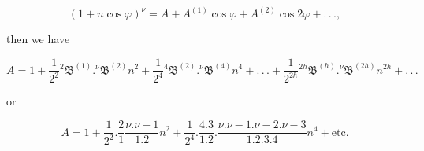 \[
(1+n\cos\varphi)^{\nu} = A + A^{(1)}\cos\varphi + A^{(2)}\cos 2\varphi + .\,.\,.,
\]

\noindent then we have

\[
A = 1 + \frac{1}{2^{2}} {}^{2}\mathfrak{B}^{(1)}  .  {}^{\nu}\mathfrak{B}^{(2)} n^{2} + \frac{1}{2^{4}} {}^{4}\mathfrak{B}^{(2)}  .  {}^{\nu}\mathfrak{B}^{(4)} n^{4} + .\,.\,. + \frac{1}{2^{2h}} {}^{2h}\mathfrak{B}^{(h)}  .  {}^{\nu}\mathfrak{B}^{(2h)} n^{2h} + .\,.\,.
\]

\noindent or

\[
A = 1 + \frac{1}{2^{2}}  .  \frac{2}{1} \frac{\nu.\nu-1}{1.2} n^{2} + \frac{1}{2^{4}}  .  \frac{4.3}{1.2}  .  \frac{\nu.\nu-1.\nu-2.\nu-3}{1.2.3.4} n^{4} + \text{etc.}
\]
